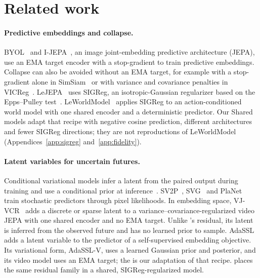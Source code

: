 \section{Related work}
\label{sec:related}

\paragraph{Predictive embeddings and collapse.} BYOL~\citep{grill2020byol} and I-JEPA~\citep{assran2023ijepa}, an image joint-embedding predictive architecture (JEPA), use an EMA target encoder with a stop-gradient to train predictive embeddings. Collapse can also be avoided without an EMA target, for example with a stop-gradient alone in SimSiam~\citep{chen2021simsiam} or with variance and covariance penalties in VICReg~\citep{bardes2022vicreg}. LeJEPA~\citep{balestriero2025lejepa} uses SIGReg, an isotropic-Gaussian regularizer based on the Epps--Pulley test~\citep{epps1983test}. LeWorldModel~\citep{maes2026lewm} applies SIGReg to an action-conditioned world model with one shared encoder and a deterministic predictor. Our Shared models adapt that recipe with negative cosine prediction, different architectures and fewer SIGReg directions; they are not reproductions of LeWorldModel (Appendices~\ref{app:sigreg} and~\ref{app:fidelity}).

\paragraph{Latent variables for uncertain futures.} Conditional variational models infer a latent from the paired output during training and use a conditional prior at inference~\citep{sohn2015cvae}. SV2P~\citep{babaeizadeh2018sv2p}, SVG~\citep{denton2018svg} and PlaNet~\citep{hafner2019planet} train stochastic predictors through pixel likelihoods. In embedding space, VJ-VCR~\citep{drozdov2024vjvcr} adds a discrete or sparse latent to a variance--covariance-regularized video JEPA with one shared encoder and no EMA target. Unlike \shvar{}'s residual, its latent is inferred from the observed future and has no learned prior to sample. AdaSSL~\citep{zhang2026adassl} adds a latent variable to the predictor of a self-supervised embedding objective. Its variational form, AdaSSL-V, uses a learned Gaussian prior and posterior, and its video model uses an EMA target; the \emavar{} is our adaptation of that recipe. \shvar{} places the same residual family in a shared, SIGReg-regularized model.

